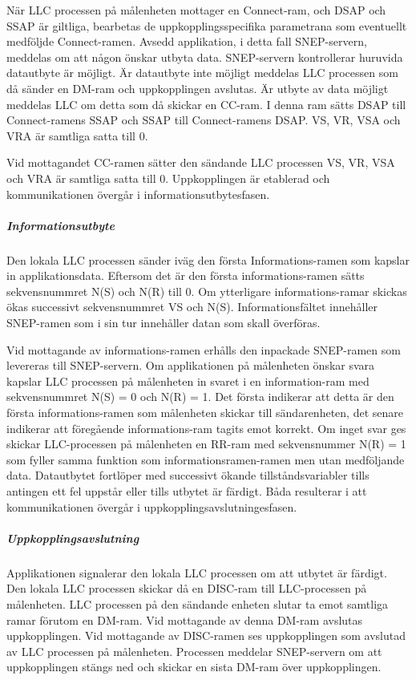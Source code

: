 \documentclass[11pt]{article}
\begin{document}
När LLC processen på målenheten mottager en Connect-ram, och DSAP och SSAP är giltliga, bearbetas de uppkopplingsspecifika parametrana som eventuellt medföljde Connect-ramen. Avsedd applikation, i detta fall SNEP-servern, meddelas om att någon önskar utbyta data. SNEP-servern kontrollerar huruvida datautbyte är möjligt. Är datautbyte inte möjligt meddelas LLC processen som då sänder en DM-ram och uppkopplingen avslutas. Är utbyte av data möjligt meddelas LLC om detta som då skickar en CC-ram. I denna ram sätts DSAP till Connect-ramens SSAP och SSAP till Connect-ramens DSAP. VS, VR, VSA och VRA är samtliga satta till 0.

Vid mottagandet CC-ramen sätter den sändande LLC processen VS, VR, VSA och VRA är samtliga satta till 0. Uppkopplingen är etablerad och kommunikationen övergår i informationsutbytesfasen.

\subparagraph{Informationsutbyte}
Den lokala LLC processen sänder  iväg den första Informations-ramen som kapslar in applikationsdata. Eftersom det är den första informations-ramen sätts sekvensnummret N(S) och N(R) till 0. Om ytterligare informations-ramar skickas ökas successivt sekvensnummret VS och N(S). Informationsfältet innehåller SNEP-ramen som i sin tur innehåller datan som skall överföras.

Vid mottagande av informations-ramen erhålls den inpackade SNEP-ramen som levereras till SNEP-servern. Om applikationen på målenheten önskar svara kapslar LLC processen på målenheten in svaret i en information-ram med sekvensnummret N(S) = 0 och N(R) = 1. Det första indikerar att detta är den första informations-ramen som målenheten skickar till sändarenheten, det senare indikerar att föregående informations-ram tagits emot korrekt. Om inget svar ges skickar LLC-processen på målenheten en RR-ram med sekvensnummer N(R) = 1 som fyller samma funktion som informationsramen-ramen men utan medföljande data. Datautbytet fortlöper med successivt ökande tillståndsvariabler tills antingen ett fel uppstår eller tills utbytet är färdigt. Båda resulterar i att kommunikationen övergår i uppkopplingsavslutningesfasen.

\subparagraph{Uppkopplingsavslutning}
Applikationen signalerar den lokala LLC processen om att utbytet är färdigt. Den lokala LLC processen skickar då en DISC-ram till LLC-processen på målenheten. LLC processen på den sändande enheten slutar ta emot samtliga ramar förutom en DM-ram. Vid mottagande av denna DM-ram avslutas uppkopplingen. 
Vid mottagande av DISC-ramen ses uppkopplingen som avslutad av LLC processen på målenheten. Processen meddelar SNEP-servern om att uppkopplingen stängs ned och skickar en sista DM-ram över uppkopplingen.
\end{document}

